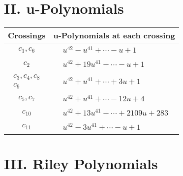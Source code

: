 \documentclass[1p]{elsarticle_modified}
\theoremstyle{definition}
\begin{document}
\newpage\renewcommand{\arraystretch}{1}
\centering \section*{ II. u-Polynomials}
\begin{tabular}{m{50pt}|m{274pt}}
Crossings & \hspace{64pt}u-Polynomials at each crossing \\
\hline $$\begin{aligned}c_{1},c_{6}\end{aligned}$$&$\begin{aligned}
&u^{42}- u^{41}+\cdots- u+1
\end{aligned}$\\
\hline $$\begin{aligned}c_{2}\end{aligned}$$&$\begin{aligned}
&u^{42}+19 u^{41}+\cdots- u+1
\end{aligned}$\\
\hline $$\begin{aligned}c_{3},c_{4},c_{8}\\c_{9}\end{aligned}$$&$\begin{aligned}
&u^{42}+u^{41}+\cdots+3 u+1
\end{aligned}$\\
\hline $$\begin{aligned}c_{5},c_{7}\end{aligned}$$&$\begin{aligned}
&u^{42}+u^{41}+\cdots-12 u+4
\end{aligned}$\\
\hline $$\begin{aligned}c_{10}\end{aligned}$$&$\begin{aligned}
&u^{42}+13 u^{41}+\cdots+2109 u+283
\end{aligned}$\\
\hline $$\begin{aligned}c_{11}\end{aligned}$$&$\begin{aligned}
&u^{42}-3 u^{41}+\cdots- u+1
\end{aligned}$\\
\hline
\end{tabular}\newpage\renewcommand{\arraystretch}{1}
\centering \section*{ III. Riley Polynomials}
\end{document}
